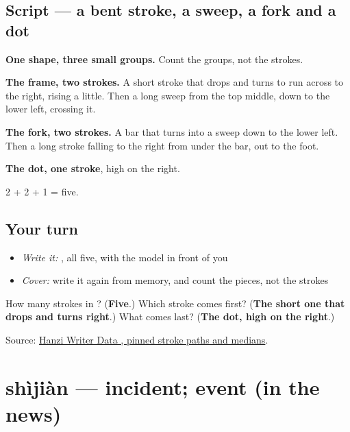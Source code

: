 \subsection*{Script — a bent stroke, a sweep, a fork and a dot}

\begin{quote}
\end{quote}

\textbf{One shape, three small groups.} Count the groups, not the strokes.

\textbf{The frame, two strokes.} A short stroke that drops and turns to run across to the right, rising a little. Then a long sweep from the top middle, down to the lower left, crossing it.

\textbf{The fork, two strokes.} A bar that turns into a sweep down to the lower left. Then a long stroke falling to the right from under the bar, out to the foot.

\textbf{The dot, one stroke}, high on the right.

2 + 2 + 1 = five.

\subsection*{Your turn}
\begin{itemize}
\raggedright
  \item \emph{Write it:} , all five, with the model in front of you
  \item \emph{Cover:} write it again from memory, and count the pieces, not the strokes
\end{itemize}

\begin{tcolorbox}[breakable,colback=teal!4,colframe=teal!35!black,title={Before you move on}]
How many strokes in ? (\textbf{Five}.) Which stroke comes first? (\textbf{The short one that drops and turns right}.) What comes last? (\textbf{The dot, high on the right}.)

Source: \href{https://raw.githubusercontent.com/chanind/hanzi-writer-data/68d10a4b21150cae5e1ebbd223eed289cf32d90c/data/\%E5\%8F\%91.json}{Hanzi Writer Data , pinned stroke paths and medians}.
\end{tcolorbox}
\section[shìjiàn]{shìjiàn — incident; event (in the news)}

